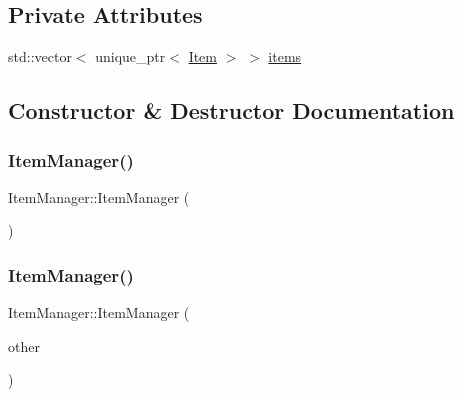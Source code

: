 \subsection*{Private Attributes}
\begin{DoxyCompactItemize}
\item 
std\+::vector$<$ unique\+\_\+ptr$<$ \mbox{\hyperlink{class_item}{Item}} $>$ $>$ \mbox{\hyperlink{class_item_manager_a67bf78a9baf31874b6cd6309e0d86e1e}{items}}
\end{DoxyCompactItemize}


\subsection{Constructor \& Destructor Documentation}
\mbox{\label{class_item_manager_a1eab68c1b49e695ba96330da469b23cc}} 
\subsubsection{\texorpdfstring{Item\+Manager()}{ItemManager()}\hspace{0.1cm}{\footnotesize\ttfamily [1/3]}}
{\footnotesize\ttfamily Item\+Manager\+::\+Item\+Manager (\begin{DoxyParamCaption}{ }\end{DoxyParamCaption})}

\mbox{\label{class_item_manager_ac6399b407125cb2e7bb0733dca40c23c}} 
\subsubsection{\texorpdfstring{Item\+Manager()}{ItemManager()}\hspace{0.1cm}{\footnotesize\ttfamily [2/3]}}
{\footnotesize\ttfamily Item\+Manager\+::\+Item\+Manager (\begin{DoxyParamCaption}\item[{\mbox{\hyperlink{class_item_manager}{Item\+Manager}} \&}]{other }\end{DoxyParamCaption})}

\mbox{\label{class_item_manager_a83c334430c14d31046389a6044f33511}} 

